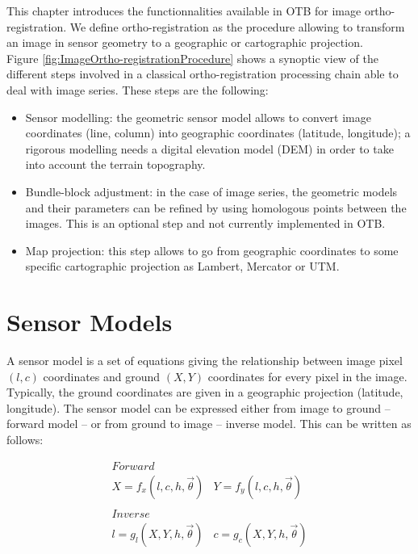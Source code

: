 This chapter introduces the functionnalities available in OTB for
image ortho-registration. We define ortho-registration as the
procedure allowing to transform an image in sensor geometry to a
geographic or cartographic projection.\\

Figure \ref{fig:ImageOrtho-registrationProcedure} shows a synoptic
view of the different steps involved in a classical ortho-registration
processing chain able to deal with image series. These steps are the following:
\begin{itemize}
  \item Sensor modelling: the geometric sensor model allows to convert
  image coordinates (line, column) into geographic coordinates
  (latitude, longitude); a rigorous modelling needs a digital
  elevation model (DEM) in order to take into account the terrain
  topography.
  \item Bundle-block adjustment: in the case of image series, the
  geometric models and their parameters can be refined by using
  homologous points between the images. This is an optional step and
  not currently implemented in OTB.
  \item Map projection: this step allows to go from geographic
  coordinates to some specific cartographic projection as Lambert,
  Mercator or UTM.
\end{itemize}


\section{Sensor Models}
\ifitkFullVersion
\label{sec:SensorModels}
\fi

A sensor model is a set of equations giving the relationship between
image pixel $(l,c)$ coordinates and ground $(X,Y)$ coordinates for every
pixel in the image. Typically, the ground coordinates are given in a
geographic projection (latitude, longitude). The sensor model
can be expressed either from image to ground -- forward model -- or
from ground to image -- inverse model. This can be written as follows:

\begin{displaymath}
  \begin{array}{cc}
    Forward & \\
    X = f_x(l,c,h,\vec\theta) & Y = f_y(l,c,h,\vec\theta)\\
     & \\ 
    Inverse & \\
    l = g_l(X,Y,h,\vec\theta) & c = g_c(X,Y,h,\vec\theta)
  \end{array}
\end{displaymath}

